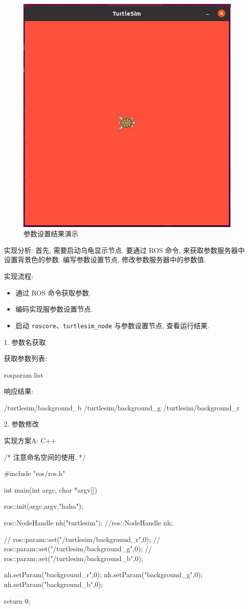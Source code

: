 \documentclass[openany, fontset=windowsold]{ctexbook}
\theoremstyle{kaiti}
\theoremstyle{normal}
\begin{document}
\begin{figure}[!ht]
  \centering
  \includegraphics[width=.5\textwidth]{ros_demo_set_param.png}
  \caption{参数设置结果演示}
  \label{fig:ros_demo_set_param}
\end{figure}

实现分析: 首先, 需要启动乌龟显示节点. 要通过 ROS 命令, 来获取参数服务器中设置背景色的参数. 编写参数设置节点, 修改参数服务器中的参数值.

实现流程:

\begin{itemize}
  \item 通过 ROS 命令获取参数.
  \item 编码实现服参数设置节点.
  \item 启动 \verb|roscore|、\verb|turtlesim_node| 与参数设置节点, 查看运行结果.
\end{itemize}

1. 参数名获取

获取参数列表:

\begin{bash}
  rosparam list
\end{bash}

响应结果:

\begin{bash}
  /turtlesim/background_b
  /turtlesim/background_g
  /turtlesim/background_r
\end{bash}

2. 参数修改

实现方案A: C++

\begin{cpp}
  /*
      注意命名空间的使用.
   */

  #include "ros/ros.h"

  int main(int argc, char *argv[])
  {
      ros::init(argc,argv,"haha");

      ros::NodeHandle nh("turtlesim");
      //ros::NodeHandle nh;

      // ros::param::set("/turtlesim/background_r",0);
      // ros::param::set("/turtlesim/background_g",0);
      // ros::param::set("/turtlesim/background_b",0);

      nh.setParam("background_r",0);
      nh.setParam("background_g",0);
      nh.setParam("background_b",0);

      return 0;
  }
\end{cpp}
\end{document}
